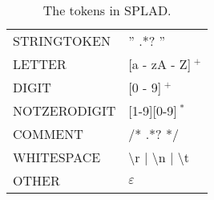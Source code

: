 \begin{table}[H]
\begin{tabular}{|l|l|}
\hline
STRINGTOKEN & '' .*? '' \\
LETTER & [a - zA - Z]$~^+$\\
DIGIT & [0 - 9]$~^+$\\
NOTZERODIGIT & [1-9][0-9]$~^*$\\
COMMENT& /* .*? */\\
WHITESPACE 		& \textbackslash r | \textbackslash n | \textbackslash t \\
OTHER 			& $\varepsilon$ \\ \hline
\end{tabular}
\caption{The tokens in SPLAD.}
\label{tab:tokens}
\end{table}